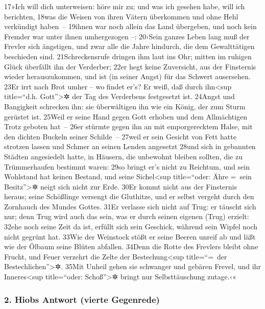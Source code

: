 17»Ich will dich unterweisen: höre mir zu; und was ich gesehen habe,
will ich berichten, 18was die Weisen von ihren Vätern überkommen und
ohne Hehl verkündigt haben~-- 19ihnen war noch allein das Land
übergeben, und noch kein Fremder war unter ihnen umhergezogen --:
20›Sein ganzes Leben lang muß der Frevler sich ängstigen, und zwar alle
die Jahre hindurch, die dem Gewalttätigen beschieden sind.
21Schreckensrufe dringen ihm laut ins Ohr; mitten im ruhigen Glück
überfällt ihn der Verderber; 22er hegt keine Zuversicht, aus der
Finsternis wieder herauszukommen, und ist (in seiner Angst) für das
Schwert ausersehen. 23Er irrt nach Brot umher -- wo findet er's? Er
weiß, daß durch ihn\textless sup title=``d.h. Gott''\textgreater✲ der
Tag des Verderbens festgesetzt ist. 24Angst und Bangigkeit schrecken
ihn: sie überwältigen ihn wie ein König, der zum Sturm gerüstet ist.
25Weil er seine Hand gegen Gott erhoben und dem Allmächtigen Trotz
geboten hat~-- 26er stürmte gegen ihn an mit emporgerecktem Halse, mit
den dichten Buckeln seiner Schilde~-- 27weil er sein Gesicht von Fett
hatte strotzen lassen und Schmer an seinen Lenden angesetzt 28und sich
in gebannten Städten angesiedelt hatte, in Häusern, die unbewohnt
bleiben sollten, die zu Trümmerhaufen bestimmt waren: 29so bringt er's
nicht zu Reichtum, und sein Wohlstand hat keinen Bestand, und seine
Sichel\textless sup title=``oder: Ähre =~sein Besitz''\textgreater✲
neigt sich nicht zur Erde. 30Er kommt nicht aus der Finsternis heraus;
seine Schößlinge versengt die Gluthitze, und er selbst vergeht durch den
Zornhauch des Mundes Gottes. 31Er verlasse sich nicht auf Trug: er
täuscht sich nur; denn Trug wird auch das sein, was er durch seinen
eigenen (Trug) erzielt: 32ehe noch seine Zeit da ist, erfüllt sich sein
Geschick, während sein Wipfel noch nicht gegrünt hat. 33Wie der
Weinstock stößt er seine Beeren unreif ab und läßt wie der Ölbaum seine
Blüten abfallen. 34Denn die Rotte des Frevlers bleibt ohne Frucht, und
Feuer verzehrt die Zelte der Bestechung\textless sup title=``=~der
Bestechlichen''\textgreater✲. 35Mit Unheil gehen sie schwanger und
gebären Frevel, und ihr Inneres\textless sup title=``oder:
Schoß''\textgreater✲ bringt nur Selbsttäuschung zutage.‹«

\hypertarget{hiobs-antwort-vierte-gegenrede}{%
\subsubsection{2. Hiobs Antwort (vierte
Gegenrede)}\label{hiobs-antwort-vierte-gegenrede}}

